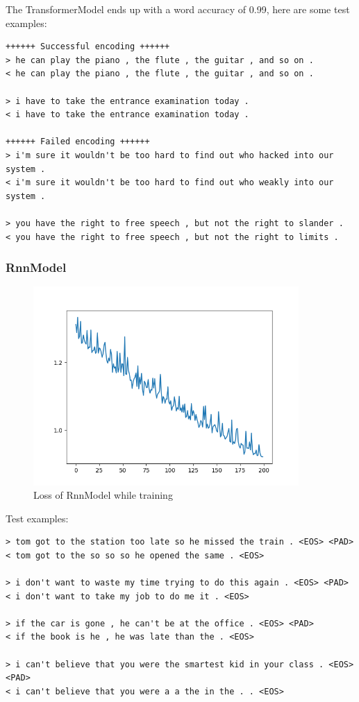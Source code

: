 \documentclass{article}
\begin{document}
The TransformerModel ends up with a word accuracy of 0.99, here are some test examples:

\begin{verbatim}
++++++ Successful encoding ++++++
> he can play the piano , the flute , the guitar , and so on .
< he can play the piano , the flute , the guitar , and so on .

> i have to take the entrance examination today .
< i have to take the entrance examination today .

++++++ Failed encoding ++++++
> i'm sure it wouldn't be too hard to find out who hacked into our system .
< i'm sure it wouldn't be too hard to find out who weakly into our system .

> you have the right to free speech , but not the right to slander .
< you have the right to free speech , but not the right to limits .
\end{verbatim}

\subsubsection{RnnModel}

\begin{figure}[h!]
    \centering
    \includegraphics[width=0.9\textwidth]{loss_from_last_few_trainings_rnn.png}
    \caption{%
        Loss of RnnModel while training
    }\label{fig:rnn}
\end{figure}

Test examples:
\begin{verbatim}
> tom got to the station too late so he missed the train . <EOS> <PAD>
< tom got to the so so so he opened the same . <EOS>

> i don't want to waste my time trying to do this again . <EOS> <PAD>
< i don't want to take my job to do me it . <EOS>

> if the car is gone , he can't be at the office . <EOS> <PAD>
< if the book is he , he was late than the . <EOS>

> i can't believe that you were the smartest kid in your class . <EOS> <PAD>
< i can't believe that you were a a the in the . . <EOS>
\end{verbatim}
\end{document}
